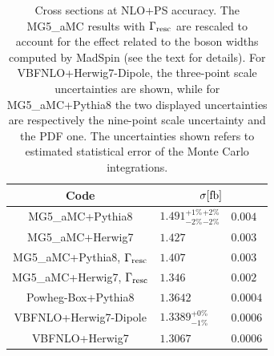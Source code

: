\documentclass[twocolumn,epjc3]{svjour3} %
\newlength{\width}
\begin{document}
\begin{table}[h!]
    \centering
    \begin{tabular}{c|l@{ $\pm$ }l}
      Code  &  \multicolumn{2}{c}{$\sigma[\rm{fb}]$}  \\
        \hline\hline
        {\sc MG5\_aMC}+{\sc Pythia8}&  $1.491 ^{+1\%}_{-2\%} {}^{+2\%}_{-2\%} $ & $0.004$  \\
        {\sc MG5\_aMC}+{\sc Herwig7}&  $1.427 $ & $0.003$  \\
        {\sc MG5\_aMC}+{\sc Pythia8}, $\Gamma_{\rm resc}$&  $1.407$ & $0.003$  \\
        {\sc MG5\_aMC}+{\sc Herwig7}, $\Gamma_{\rm resc}$&  $1.346$ & $0.002$  \\
        {\sc Powheg-Box}+{\sc Pythia8}  & $1.3642$ & $0.0004$  \\
        {\sc VBFNLO}+{\sc Herwig7-Dipole} &  $1.3389 ^{+0\%}_{-1\%}$ & $0.0006$  \\
        {\sc VBFNLO}+{\sc Herwig7} &  $1.3067$ & $0.0006$  \\
    \end{tabular}
    \caption{\label{tab:PSratesNLO} Cross sections at NLO+PS accuracy.
    The {\sc MG5\_aMC} results with $\Gamma_{\rm resc}$
    are rescaled to account for the effect related to the boson widths computed by {\sc MadSpin} (see the text for details). For
    {\sc VBFNLO}+{\sc Herwig7-Dipole}, the three-point scale uncertainties are shown, while for  {\sc MG5\_aMC}+{\sc Pythia8} the two displayed uncertainties
are respectively the nine-point scale uncertainty and the PDF one.
The uncertainties shown refers to estimated statistical error of the Monte Carlo integrations.}
\end{table}
\end{document}

